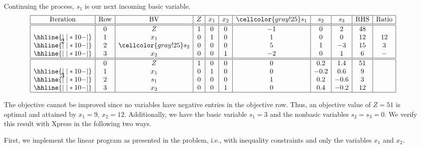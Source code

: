 \documentclass[12pt]{article}
\theoremstyle{definition}
\begin{document}
Continuing the process, $s_1$ is our next incoming basic variable.
\[\begin{array}{*{11}{|c}|}
    \hline
    \text{Iteration} & \text{Row} & \text{BV} & Z & x_1 & x_2 & \cellcolor{gray!25}s_1 & s_2 & s_3 & \text{RHS} & \text{Ratio} \\\hline\hline
    \multirow{4}*{2}
    & 0 & Z   & 1 & 0  & 0 & -1  & 0 & 2 & 48 & \\\hhline{|~|*{10}{-}|}
    & 1 & x_1 & 0 & 1  & 0  & 1  & 0 & 0 & 12 & 12 \\\hhline{|~|*{10}{-}|}
    & 2 & \cellcolor{gray!25}s_2 & 0 &  0 & 0  & 5 & 1 & -3 & 15 & 3 \\\hhline{|~|*{10}{-}|}
    & 3 & x_2 & 0 & 0  & 1  & -2 & 0 & 1 & 6  & - \\\hline
    \hline
    \multirow{4}*{3}
    & 0 & Z   & 1 & 0  & 0 & 0  & 0.2 & 1.4 & 51 & \\\hhline{|~|*{10}{-}|}
    & 1 & x_1 & 0 & 1  & 0  & 0  & -0.2 & 0.6 & 9 & \\\hhline{|~|*{10}{-}|}
    & 2 & s_1 & 0 &  0 & 0  & 1 & 0.2 & -0.6 & 3 & \\\hhline{|~|*{10}{-}|}
    & 3 & x_2 & 0 & 0  & 1  & 0 & 0.4 & -0.2 & 12  & \\\hline
\end{array}\]

The objective cannot be improved since no variables have negative entries in the objective row. Thus, an objective value of $Z = 51$ is optimal and attained by $x_1 = 9$, $x_2 = 12$. Additionally, we have the basic variable $s_1 = 3$ and the nonbasic variables $s_2 = s_3 = 0$. We verify this result with Xpress in the following two ways.

\newpage

First, we implement the linear program as presented in the problem, i.e., with inequality constraints and only the variables $x_1$ and $x_2$.\\
\end{document}
